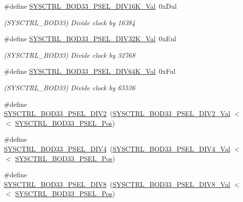 \begin{DoxyCompactItemize}
\#define \mbox{\hyperlink{group___s_a_m_d21___s_y_s_c_t_r_l_ga7a156a56f148326cc305360194b1f391}{S\+Y\+S\+C\+T\+R\+L\+\_\+\+B\+O\+D33\+\_\+\+P\+S\+E\+L\+\_\+\+D\+I\+V16\+K\+\_\+\+Val}}~0x\+Dul
\begin{DoxyCompactList}\small\item\em (S\+Y\+S\+C\+T\+R\+L\+\_\+\+B\+O\+D33) Divide clock by 16384 \end{DoxyCompactList}\item 
\#define \mbox{\hyperlink{group___s_a_m_d21___s_y_s_c_t_r_l_ga6b89e5d9475cdfc7534bcb5775b55154}{S\+Y\+S\+C\+T\+R\+L\+\_\+\+B\+O\+D33\+\_\+\+P\+S\+E\+L\+\_\+\+D\+I\+V32\+K\+\_\+\+Val}}~0x\+Eul
\begin{DoxyCompactList}\small\item\em (S\+Y\+S\+C\+T\+R\+L\+\_\+\+B\+O\+D33) Divide clock by 32768 \end{DoxyCompactList}\item 
\#define \mbox{\hyperlink{group___s_a_m_d21___s_y_s_c_t_r_l_ga66fbed4bf3da7720cd293d062c92e8e5}{S\+Y\+S\+C\+T\+R\+L\+\_\+\+B\+O\+D33\+\_\+\+P\+S\+E\+L\+\_\+\+D\+I\+V64\+K\+\_\+\+Val}}~0x\+Ful
\begin{DoxyCompactList}\small\item\em (S\+Y\+S\+C\+T\+R\+L\+\_\+\+B\+O\+D33) Divide clock by 65536 \end{DoxyCompactList}\item 
\#define \mbox{\hyperlink{group___s_a_m_d21___s_y_s_c_t_r_l_ga5aa71dbdee4d9da3ef0c974aa63d5cb3}{S\+Y\+S\+C\+T\+R\+L\+\_\+\+B\+O\+D33\+\_\+\+P\+S\+E\+L\+\_\+\+D\+I\+V2}}~(\mbox{\hyperlink{group___s_a_m_d21___s_y_s_c_t_r_l_ga365e5ff0fdd9a11473074318ab71be69}{S\+Y\+S\+C\+T\+R\+L\+\_\+\+B\+O\+D33\+\_\+\+P\+S\+E\+L\+\_\+\+D\+I\+V2\+\_\+\+Val}}   $<$$<$ \mbox{\hyperlink{group___s_a_m_d21___s_y_s_c_t_r_l_ga73a89199fbe33475f4dd5e5c84e5089d}{S\+Y\+S\+C\+T\+R\+L\+\_\+\+B\+O\+D33\+\_\+\+P\+S\+E\+L\+\_\+\+Pos}})
\item 
\#define \mbox{\hyperlink{group___s_a_m_d21___s_y_s_c_t_r_l_gaf13fe6831e4afd0dd053b1feba864e06}{S\+Y\+S\+C\+T\+R\+L\+\_\+\+B\+O\+D33\+\_\+\+P\+S\+E\+L\+\_\+\+D\+I\+V4}}~(\mbox{\hyperlink{group___s_a_m_d21___s_y_s_c_t_r_l_gac2daa4e2d5da8c26f7b64da9a73192de}{S\+Y\+S\+C\+T\+R\+L\+\_\+\+B\+O\+D33\+\_\+\+P\+S\+E\+L\+\_\+\+D\+I\+V4\+\_\+\+Val}}   $<$$<$ \mbox{\hyperlink{group___s_a_m_d21___s_y_s_c_t_r_l_ga73a89199fbe33475f4dd5e5c84e5089d}{S\+Y\+S\+C\+T\+R\+L\+\_\+\+B\+O\+D33\+\_\+\+P\+S\+E\+L\+\_\+\+Pos}})
\item 
\#define \mbox{\hyperlink{group___s_a_m_d21___s_y_s_c_t_r_l_gaae71160ebd291a8e28d6763cdb1b1bed}{S\+Y\+S\+C\+T\+R\+L\+\_\+\+B\+O\+D33\+\_\+\+P\+S\+E\+L\+\_\+\+D\+I\+V8}}~(\mbox{\hyperlink{group___s_a_m_d21___s_y_s_c_t_r_l_gaa1ad5b1483db3f43c7c342ea50967e37}{S\+Y\+S\+C\+T\+R\+L\+\_\+\+B\+O\+D33\+\_\+\+P\+S\+E\+L\+\_\+\+D\+I\+V8\+\_\+\+Val}}   $<$$<$ \mbox{\hyperlink{group___s_a_m_d21___s_y_s_c_t_r_l_ga73a89199fbe33475f4dd5e5c84e5089d}{S\+Y\+S\+C\+T\+R\+L\+\_\+\+B\+O\+D33\+\_\+\+P\+S\+E\+L\+\_\+\+Pos}})
$$
\end{DoxyCompactItemize}
